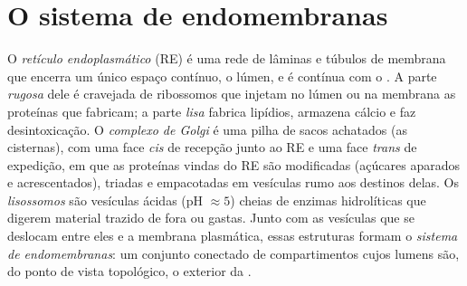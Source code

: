 \section{O sistema de endomembranas}

\begin{definition}\label{def:b1:eukaryotic-cell:endomembrane}
O \emph{retículo endoplasmático} (RE) é
uma rede de lâminas e túbulos de membrana que encerra um único espaço
contínuo, o lúmen, e é contínua com o . A parte
\emph{rugosa} dele é cravejada de
ribossomos que injetam no lúmen ou na membrana as proteínas que
fabricam; a parte \emph{lisa}
fabrica lipídios, armazena cálcio e faz desintoxicação. O
\emph{complexo de Golgi} é uma pilha de sacos
achatados (as cisternas), com uma face \emph{cis} de recepção junto ao
RE e uma face \emph{trans} de expedição, em que as proteínas vindas do
RE são modificadas (açúcares aparados e acrescentados), triadas e
empacotadas em vesículas rumo aos destinos delas. Os
\emph{lisossomos} são vesículas ácidas (pH
$\approx 5$) cheias de enzimas hidrolíticas que digerem material trazido
de fora ou  gastas. Junto com as vesículas que se deslocam
entre eles e a membrana plasmática, essas estruturas formam o
\emph{sistema de endomembranas}: um
conjunto conectado de compartimentos cujos lumens são, do ponto de vista
topológico, o exterior da .
\end{definition}

